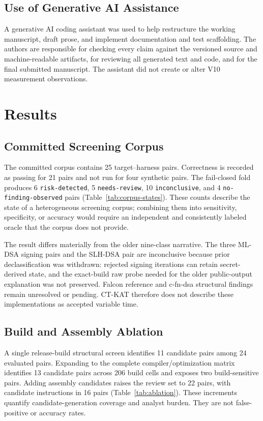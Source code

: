 \documentclass[cryptography,article,submit,moreauthors]{Definitions/mdpi}
\newcommand{\evidence}[1]{\texttt{#1}}
\begin{document}
\subsection{Use of Generative AI Assistance}

A generative AI coding assistant was used to help restructure the working
manuscript, draft prose, and implement documentation and test scaffolding. The
authors are responsible for checking every claim against the versioned source
and machine-readable artifacts, for reviewing all generated text and code, and
for the final submitted manuscript. The assistant did not create or alter V10
measurement observations.

\section{Results}
\label{sec:results}

\subsection{Committed Screening Corpus}

The committed corpus contains 25 target--harness pairs. Correctness is recorded
as passing for 21 pairs and not run for four synthetic pairs. The fail-closed
fold produces 6 \evidence{risk-detected}, 5 \evidence{needs-review}, 10
\evidence{inconclusive}, and 4 \evidence{no-finding-observed} pairs
(Table~\ref{tab:corpus-states}). These counts describe the state of a
heterogeneous screening corpus; combining them into sensitivity, specificity,
or accuracy would require an independent and consistently labeled oracle that
the corpus does not provide.

The result differs materially from the older nine-class narrative. The three
ML-DSA signing pairs and the SLH-DSA pair are inconclusive because prior
declassification was withdrawn: rejected signing iterations can retain
secret-derived state, and the exact-build raw probe needed for the older
public-output explanation was not preserved. Falcon reference and c-fn-dsa
structural findings remain unresolved or pending. CT-KAT therefore does not
describe these implementations as accepted variable time.

\subsection{Build and Assembly Ablation}

A single release-build structural screen identifies 11 candidate pairs among
24 evaluated pairs. Expanding to the complete compiler/optimization matrix
identifies 13 candidate pairs across 206 build cells and exposes two
build-sensitive pairs. Adding assembly candidates raises the review set to 22
pairs, with candidate instructions in 16 pairs
(Table~\ref{tab:ablation}). These increments quantify candidate-generation
coverage and analyst burden. They are not false-positive or accuracy rates.
\end{document}
